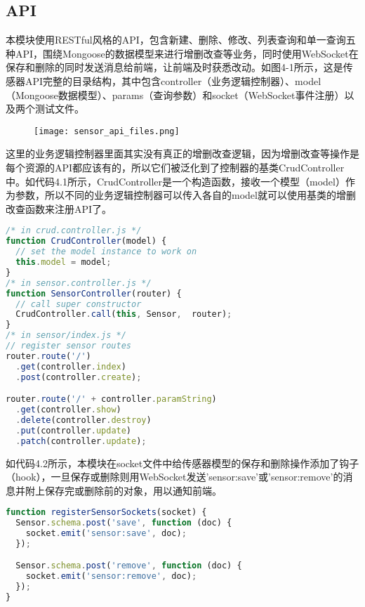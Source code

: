 \subsection{API}
本模块使用RESTful风格的API，包含新建、删除、修改、列表查询和单一查询五种API，围绕Mongoose的数据模型来进行增删改查等业务，同时使用WebSocket在保存和删除的同时发送消息给前端，让前端及时获悉改动。如图4-1所示，这是传感器API完整的目录结构，其中包含controller（业务逻辑控制器）、model（Mongoose数据模型）、params（查询参数）和socket（WebSocket事件注册）以及两个测试文件。
\begin{figure}[H]
 \centering
 \texttt{[image: sensor\_api\_files.png]}
\end{figure}
这里的业务逻辑控制器里面其实没有真正的增删改查逻辑，因为增删改查等操作是每个资源的API都应该有的，所以它们被泛化到了控制器的基类CrudController中。如代码4.1所示，CrudController是一个构造函数，接收一个模型（model）作为参数，所以不同的业务逻辑控制器可以传入各自的model就可以使用基类的增删改查函数来注册API了。
\begin{lstlisting}[language={JavaScript}, caption={传感器API定义}]
/* in crud.controller.js */
function CrudController(model) {
  // set the model instance to work on
  this.model = model;
}
/* in sensor.controller.js */
function SensorController(router) {
  // call super constructor
  CrudController.call(this, Sensor,  router);
}
/* in sensor/index.js */
// register sensor routes
router.route('/')
  .get(controller.index)
  .post(controller.create);

router.route('/' + controller.paramString)
  .get(controller.show)
  .delete(controller.destroy)
  .put(controller.update)
  .patch(controller.update);
\end{lstlisting}

如代码4.2所示，本模块在socket文件中给传感器模型的保存和删除操作添加了钩子（hook），一旦保存或删除则用WebSocket发送'sensor:save'或'sensor:remove'的消息并附上保存完或删除前的对象，用以通知前端。
\begin{lstlisting}[language={JavaScript}, caption={传感器资源的Socket注册函数}]
function registerSensorSockets(socket) {
  Sensor.schema.post('save', function (doc) {
    socket.emit('sensor:save', doc);
  });

  Sensor.schema.post('remove', function (doc) {
    socket.emit('sensor:remove', doc);
  });
}
\end{lstlisting}

